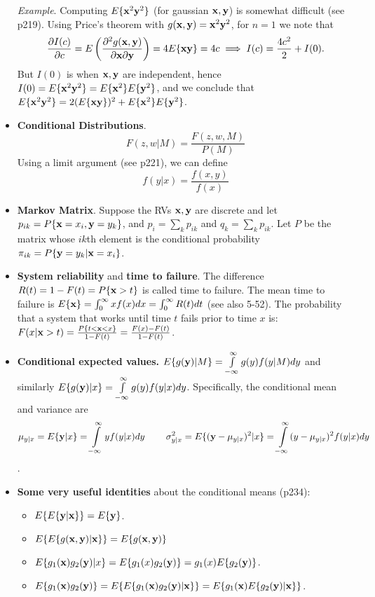 \documentclass[a4paper, oneside]{book}
\begin{document}
\begin{itemize}
\textit{Example}. Computing $E\{\mathbf x^2 \mathbf y^2\}$ (for gaussian $\mathbf{x,y}$) is somewhat difficult (see p219). Using Price's theorem with $g(\mathbf{x,y}) = \mathbf{x}^2 \mathbf y^2$, for $n=1$ we note that
$$\frac{\partial I(c)}{\partial c} = E\left( \frac{\partial^2 g(\mathbf{x,y})}{\partial \mathbf x \partial \mathbf y} \right) = 4 E\{\mathbf{xy}\}= 4c \implies I(c) = \frac{4c^2}{2} + I(0).$$
But $I(0)$ is when $\mathbf{x,y}$ are independent, hence $I(0) = E\{\mathbf{x}^2 \mathbf y^2\} = E\{\mathbf x^2\} E\{\mathbf y^2\}$, and we conclude that $E\{\mathbf{x}^2 \mathbf y^2\} = 2(E\{\mathbf x \mathbf y\})^2+E\{\mathbf x^2\} E\{\mathbf y^2\}$.\item \textbf{Conditional Distributions}. $$F(z,w|M) = \frac{F(z,w,M)}{P(M)}$$ %
Using a limit argument (see p221), we can define $$f(y|x) = \frac{f(x,y)}{f(x)}$$
\item \textbf{Markov Matrix}. Suppose the RVs $\mathbf{x,y}$ are discrete and let $p_{ik} = P\{\mathbf x = x_i,\mathbf y = y_k\}$, and $p_i = \sum_k p_{ik}$ and $q_k = \sum_k p_{ik} $. Let $P$ be the matrix whose $ik$th element is the conditional probability $\pi_{ik} = P\{\mathbf y = y_k | \mathbf x=x_i \}$.
\item \textbf{System reliability} and \textbf{time to failure}. The difference $R(t) = 1 - F(t) = P\{ \mathbf x > t\}$ is called time to failure. The mean time to failure is $E\{\mathbf x\} = \int_0^\infty xf(x)dx = \int_0^\infty R(t) dt$ (see also 5-52). The probability that a system that works until time $t$ fails prior to time $x$ is: $F(x|\mathbf{x} >t) = \frac{P\{t <\mathbf x < x\}}{1-F(t)} = \frac{F(x) - F(t)}{1-F(t)}$.
\item \textbf{Conditional expected values.} $E\{g(\mathbf y) | M\} = \int \limits_{-\infty}^\infty g(y) f(y|M) dy$ and similarly $E\{g(\mathbf y) | x\} = \int \limits_{-\infty}^\infty g(y) f(y|x) dy$. Specifically, the conditional mean and variance are $$\mu_{y|x} = E\{\mb y |x\} = \int\lii y f(y|x) dy \hspace{0.8truecm} \sigma^2_{y|x} = E\{ (\mb y - \mu_{y|x})^2 | x \} = \int\lii(y-\mu_{y|x})^2 f(y|x) dy$$.
\item \textbf{Some very useful identities} about the conditional means (p234):
	\begin{itemize}
	\item $E\{E\{\mathbf{y | x}\}\} = E\{\mathbf y\}$.
	\item $E\{ E\{ g(\mathbf{x,y}) |\mathbf x\} \} = E\{g(\mathbf{x,y})\}$
	\item $E\{ g_1(\mathbf x) g_2(\mathbf y) | x \} = E\{ g_1 (x) g_2(\mathbf y) \} = g_1(x) E\{g_2(\mathbf y)\}$.
	\item $E\{g_1(\mathbf x) g_2(\mathbf y)\} = E\{E\{ g_1( \mathbf x) g_2( \mathbf y) | \mathbf x  \}\} = E\{ g_1(\mathbf x) E\{ g_2 (\mathbf y) | \mathbf x \} \}$.
	\end{itemize}
 \end{itemize}
\end{document}

